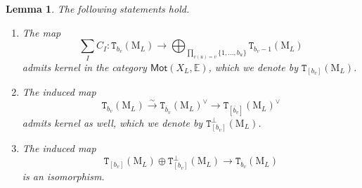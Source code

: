 \documentclass[12pt]{amsart}
\numberwithin{equation}{section}
\theoremstyle{plain}
\newtheorem{lem}[proposition]{Lemma}
\theoremstyle{definition}
\theoremstyle{remark}
\renewcommand{\d}[1]{\mathbb{#1}}
\renewcommand{\r}[1]{\mathrm{#1}}
\renewcommand{\sf}[1]{\mathsf{#1}}
\renewcommand{\(}{\left(}
\renewcommand{\)}{\right)}
\newcommand{\ol}[1]{\overline{#1}{}}
\newcommand{\dE}{\d E}
\newcommand{\rM}{\r M}
\newcommand{\tT}{\mathtt{T}}
\newcommand{\Mot}{\sf{Mot}}
\begin{document}
\begin{lem}\label{le:harmonic_motive}
The following statements hold.
\begin{enumerate}
  \item The map
      \[
      \sum_{I}C_I\colon \tT_{b_v}(\rM_L)\to\bigoplus_{\prod_{v(u)=v}\{1,\dots,b_u\}}\tT_{b_v-1}(\rM_L)
      \]
      admits kernel in the category $\Mot(X_L,\dE)$, which we denote by $\tT_{[b_v]}(\rM_L)$.

  \item The induced map
      \[
      \tT_{b_v}(\rM_L)\xrightarrow{\sim}\tT_{\ol{b}_v}(\rM_L)^\vee\to\tT_{[\ol{b}_v]}(\rM_L)^\vee
      \]
      admits kernel as well, which we denote by $\tT_{[b_v]}^\perp(\rM_L)$.

  \item The induced map
      \[
      \tT_{[b_v]}(\rM_L)\oplus\tT_{[b_v]}^\perp(\rM_L)\to\tT_{b_v}(\rM_L)
      \]
      is an isomorphism.
\end{enumerate}
\end{lem}
\end{document}
